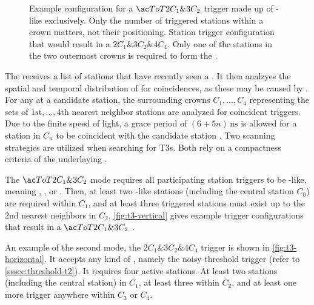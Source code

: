 \begin{figure}[t]
  \centering
  \hspace{0.2cm}
  \caption[]{ Example configuration for a 
  $\ToT2C_1\&3C_2$ \TTHREE trigger made up of \ToT-like \TTWOs exclusively. 
  Only the number of triggered stations within a crown matters, not their 
  positioning.  Station trigger configuration that 
  would result in a $2C_1\&3C_2\&4C_4$. Only one of the stations in the two 
  outermost crowns is required to form the \TTHREE.}
  \label{fig:}
\end{figure}

The \CDAS receives a list of stations that have recently seen a \TTWO. It then
analzyes the spatial and temporal distribution of \TTWOs for coincidences, as 
these may be caused by \EASs. For any \TTWO at a candidate station, the 
surrounding crowns $C_1, ..., C_4$ representing the sets of  
$1\mathrm{st}, ..., 4\mathrm{th}$ nearest neighbor stations are analyzed for 
coincident \TTWO triggers. Due to the finite speed of light, a grace period of 
$(6 + 5n)\,\mathrm{ns}$ is allowed for a station in $C_n$ to be coincident with
the candidate station \cite{abrahamTriggerApertureSurface2010}. Two scanning 
strategies are utilized when searching for \acfp{T3}. Both rely on a 
compactness criteria of the underlaying \TTWOs.

The $\ToT2C_1\&3C_2$ mode requires all participating station triggers to be 
\ToT-like, meaning \ToT, \ToTd, or \MoPS. Then, at least two \ToT-like stations
(including the central station $C_0$) are required within $C_1$, and at least 
three triggered stations must exist up to the $2\mathrm{nd}$ nearest neighbors 
in $C_2$. \cref{fig:t3-vertical} gives example trigger configurations that 
result in a $\ToT2C_1\&3C_2$ \TTHREE.

An example of the second mode, the $2C_1\&3C_2\&4C_4$ \TTHREE trigger is shown
in \cref{fig:t3-horizontal}. It accepts any kind of \TTWO, namely the noisy 
threshold trigger (refer to \cref{sssec:threshold-t2}). It requires four 
active stations. At least two stations (including the central station) in 
$C_1$, at least three within $C_2$, and at least one more trigger anywhere 
within $C_3$ or $C_4$.

